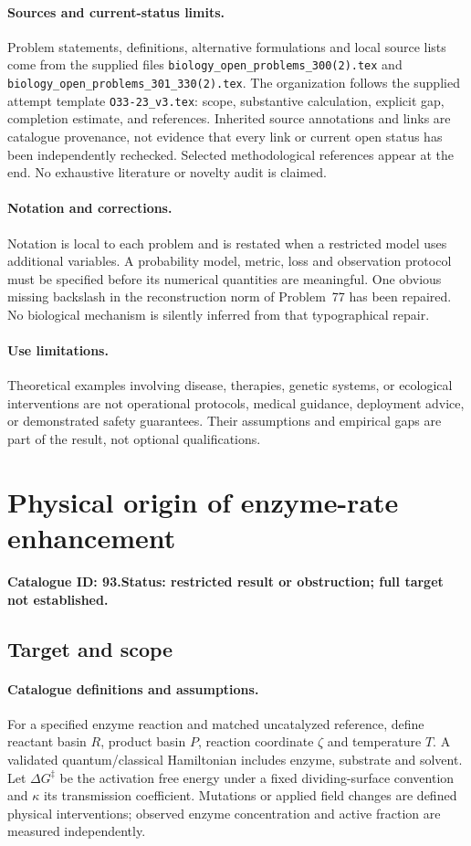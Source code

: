 \documentclass[11pt]{article}
\begin{document}
\paragraph{Sources and current-status limits.}
Problem statements, definitions, alternative formulations and local source lists
come from the supplied files
\texttt{biology\_open\_problems\_300(2).tex} and
\texttt{biology\_open\_problems\_301\_330(2).tex}.
The organization follows the supplied attempt template
\texttt{O33-23\_v3.tex}: scope, substantive calculation, explicit gap,
completion estimate, and references. Inherited source annotations and links are
catalogue provenance, not evidence that every link or current open status has
been independently rechecked. Selected methodological references appear at the
end. No exhaustive literature or novelty audit is claimed.

\paragraph{Notation and corrections.}
Notation is local to each problem and is restated when a restricted model uses
additional variables. A probability model, metric, loss and observation protocol
must be specified before its numerical quantities are meaningful. One obvious
missing backslash in the reconstruction norm of Problem~77 has been repaired.
No biological mechanism is silently inferred from that typographical repair.

\paragraph{Use limitations.}
Theoretical examples involving disease, therapies, genetic systems, or ecological
interventions are not operational protocols, medical guidance, deployment advice,
or demonstrated safety guarantees. Their assumptions and empirical gaps are part
of the result, not optional qualifications.

\setcounter{section}{92}
\section{Physical origin of enzyme-rate enhancement}
\label{prob:093}
\noindent\textbf{Catalogue ID: 93.}\quad \textbf{Status: restricted result or obstruction; full target not established.}
\subsection{Target and scope}
\paragraph{Catalogue definitions and assumptions.}
For a specified enzyme reaction and matched uncatalyzed reference, define reactant basin $R$, product basin $P$, reaction coordinate $\zeta$ and temperature $T$. A validated quantum/classical Hamiltonian includes enzyme, substrate and solvent. Let $\Delta G^\ddagger$ be the activation free energy under a fixed dividing-surface convention and $\kappa$ its transmission coefficient. Mutations or applied field changes are defined physical interventions; observed enzyme concentration and active fraction are measured independently.
\end{document}
